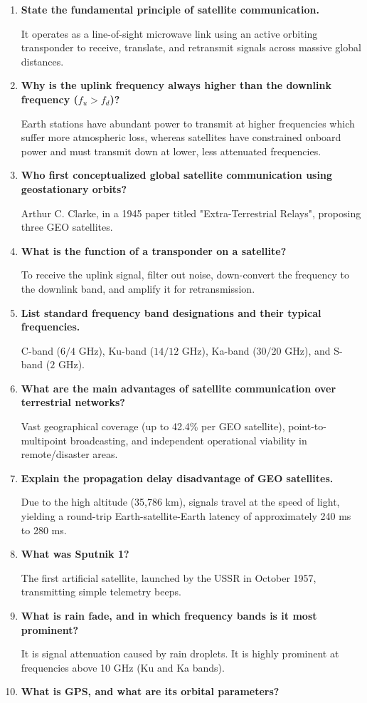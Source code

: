 \documentclass[12pt,a4paper]{article}
\newcommand{\Q}[1]{\textbf{#1}\par\noindent\ignorespaces}
\begin{document}
\begin{tcolorbox}[exambox, title={\textbf{Frequently Asked / Viva Questions}}]
\begin{enumerate}[topsep=0pt, label=\textbf{Q\arabic*.}, itemsep=5pt]
  \item \Q{State the fundamental principle of satellite communication.}
    It operates as a line-of-sight microwave link using an active orbiting transponder to receive, translate, and retransmit signals across massive global distances.
  \item \Q{Why is the uplink frequency always higher than the downlink frequency ($f_u > f_d$)?}
    Earth stations have abundant power to transmit at higher frequencies which suffer more atmospheric loss, whereas satellites have constrained onboard power and must transmit down at lower, less attenuated frequencies.
  \item \Q{Who first conceptualized global satellite communication using geostationary orbits?}
    Arthur C. Clarke, in a 1945 paper titled "Extra-Terrestrial Relays", proposing three GEO satellites.
  \item \Q{What is the function of a transponder on a satellite?}
    To receive the uplink signal, filter out noise, down-convert the frequency to the downlink band, and amplify it for retransmission.
  \item \Q{List standard frequency band designations and their typical frequencies.}
    C-band ($6/4$ GHz), Ku-band ($14/12$ GHz), Ka-band ($30/20$ GHz), and S-band ($2$ GHz).
  \item \Q{What are the main advantages of satellite communication over terrestrial networks?}
    Vast geographical coverage (up to 42.4\% per GEO satellite), point-to-multipoint broadcasting, and independent operational viability in remote/disaster areas.
  \item \Q{Explain the propagation delay disadvantage of GEO satellites.}
    Due to the high altitude (35,786 km), signals travel at the speed of light, yielding a round-trip Earth-satellite-Earth latency of approximately 240 ms to 280 ms.
  \item \Q{What was Sputnik 1?}
    The first artificial satellite, launched by the USSR in October 1957, transmitting simple telemetry beeps.
  \item \Q{What is rain fade, and in which frequency bands is it most prominent?}
    It is signal attenuation caused by rain droplets. It is highly prominent at frequencies above 10 GHz (Ku and Ka bands).
  \item \Q{What is GPS, and what are its orbital parameters?}

\end{enumerate}
\end{tcolorbox}
\end{document}
